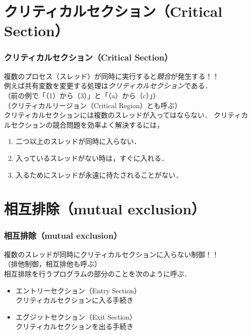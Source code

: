 \documentclass[unicode,handout]{beamer}                   %
\begin{document}
\section{クリティカルセクション（Critical Section）}
\begin{frame}
  \frametitle{クリティカルセクション（Critical Section）}
  複数のプロセス（スレッド）が同時に実行すると\emph{競合}が発生する！！\\
  例えば共有変数を変更する処理は\emph{クリティカルセクション}である．\\
  （前の例で「（1）から（3）」と「（a）から（c）」）\\
  （クリティカルリージョン（Critical Region）とも呼ぶ）\\
  クリティカルセクションには複数のスレッドが入ってはならない．
  \vfill
  クリティカルセクションの競合問題を効率よく解決するには，
  \begin{enumerate}
  \item[(1)] 二つ以上のスレッドが同時に入らない．
  \item[(2)] 入っているスレッドがない時は，すぐに入れる．
  \item[(3)] 入るためにスレッドが永遠に待たされることがない．
  \end{enumerate}
  \vfill
\end{frame}

\section{相互排除（mutual exclusion）}
\begin{frame}
  \frametitle{相互排除（mutual exclusion）}
  複数のスレッドが同時にクリティカルセクションに入らない制御！！\\
  （排他制御，相互排他も呼ぶ）\\
  \vfill
  相互排除を行うプログラムの部分のことを次のように呼ぶ．
  \begin{itemize}
  \item エントリーセクション（Entry Section）\\
    クリティカルセクションに入る手続き
  \item エグジットセクション（Exit Section）\\
    クリティカルセクションを出る手続き
  \end{itemize}
  \vfill
\end{frame}
\end{document}
